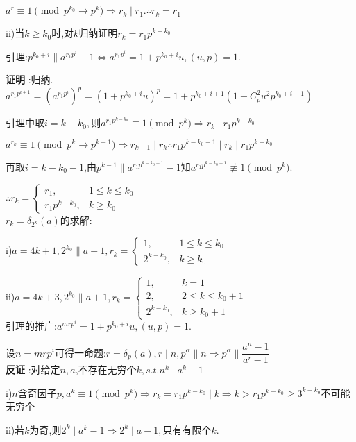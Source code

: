 $ a^r\equiv1 \pmod{p^{k_0}\rightarrow p^k}\Rightarrow r_k\mid r_1. \therefore r_k=r_1$

ii)当$ k\ge k_0$时,对$k $归纳证明$ r_k=r_1 p^{k-k_0}$

引理:$ p^{k_0+i}\parallel a^{r_1p^i}-1\Leftrightarrow a^{r_1p^i}=1+p^{k_0+i}u,(u,p)=1$.

{\bf 证明 }:归纳.
$ a^{r_1p^{i+1}}=(a^{r_1p^i})^p=(1+p^{k_0+i}u)^p=1+p^{k_0+i+1}(1+C_p^2u^2p^{k_0+i-1})$

引理中取$ i=k-k_0,$则$ a^{r_1p^{k-k_0}}\equiv 1 \pmod{p^k}\Rightarrow r_k \mid r_1p^{k-k_0}$

$ a^{r_k}\equiv 1\pmod{p^k \rightarrow p^{k-1}}\Rightarrow r_{k-1}\mid r_k \therefore r_1p^{k-k_0-1}\mid r_k \mid r_1p^{k-k_0}$

再取$ i=k-k_0-1$,由$ p^{k-1}\parallel a^{r_1p^{k-k_0-1}}-1$知$ a^{r_1p^{k-k_0-1}}\not \equiv 1 \pmod{p^k}.$


$  \therefore r_k=
\begin{cases}
r_1, & 1\le k \le k_0 \\
r_1p^{k-k_0}, & k\ge k_0 
\end{cases} 
$
\\

$ r_k=\delta_{2^k}(a)$的求解:

i)$ a=4k+1,2^{k_0}\parallel a-1,r_k=
\begin{cases}
1,& 1\le k \le k_0 \\ 
2^{k-k_0},& k\ge k_0 
\end{cases}
$ 

ii)$ a=4k+3,2^{k_0}\parallel a+1,r_k=
\begin{cases} 
1,& k=1 \\ 
2,& 2\le k\le k_0+1 \\ 
2^{k-k_0},& k\ge k_0+1 
\end{cases}$
\\

引理的推广:$ a^{mrp^i}=1+p^{k_0+i}u,(u,p)=1.$

设$ n=mrp^i$可得一命题:$ r=\delta_p(a),r\mid n,p^{\alpha}\parallel n\Rightarrow p^{\alpha}\parallel \dfrac{a^n-1}{a^r-1} $
\\

{\bf 反证 }:对给定$ n,a$,不存在无穷个$ k,s.t.n^k\mid a^k-1$

i)$ n$含奇因子$ p,a^k\equiv 1 \pmod {p^k}\Rightarrow r_k=r_1p^{k-k_0}\mid k\Rightarrow k>r_1p^{k-k_0}\ge 3^{k-k_0}$不可能无穷个

ii)若$ k$为奇,则$ 2^k\mid a^k-1\Rightarrow 2^k\mid a-1,$只有有限个$ k$.

